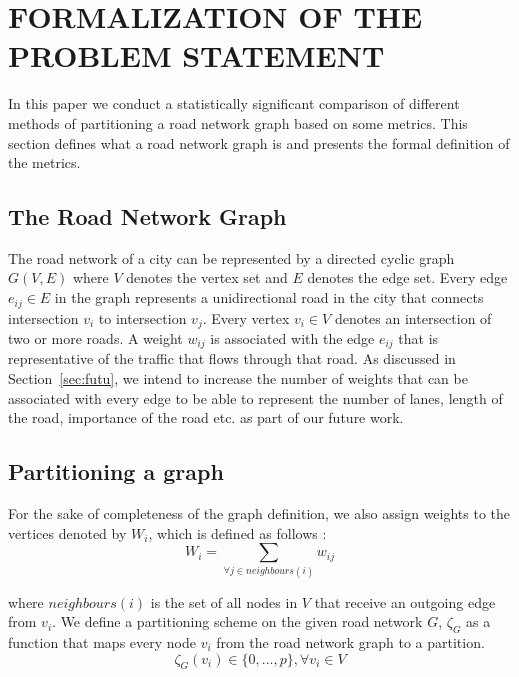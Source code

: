 \section{FORMALIZATION OF THE PROBLEM STATEMENT}
\label{sec:form}

In this paper we conduct a statistically significant comparison of different methods of partitioning a road network graph based on some metrics. This section defines what a road network graph is and presents the formal definition of the metrics.

\subsection{The Road Network Graph}
\label{sec:form-road-netw-grap}
The road network of a city can be represented by a directed cyclic graph~\cite{holden1995mathematical} $G(V, E)$ where $V$ denotes the vertex set and $E$ denotes the edge set. Every edge $e_{ij} \in E$ in the graph represents a unidirectional road in the city that connects intersection $v_i$ to intersection $v_j$. Every vertex $v_i \in V$ denotes an intersection of two or more roads. A weight $w_{ij}$ is associated with the edge $e_{ij}$ that is representative of the traffic that flows through that road. As discussed in Section~\ref{sec:futu}, we intend to increase the number of weights that can be associated with every edge to be able to represent the number of lanes, length of the road, importance of the road etc. as part of our future work.

\subsection{Partitioning a graph}
\label{sec:form-part}
For the sake of completeness of the graph definition, we also assign weights to the vertices denoted by $W_i$, which is defined as follows :
\begin{equation}
\label{eq:vertex-weight}
W_i = \sum\limits_{\forall j \in neighbours(i)} w_{ij}
\end{equation}

\noindent where $neighbours(i)$ is the set of all nodes in $V$ that receive an outgoing edge from $v_i$. We define a partitioning scheme on the given road network $G$, $\zeta_G$ as a function that maps every node $v_i$ from the road network graph to a partition.
\begin{equation}
\label{eq:part-sche}
\zeta_G(v_i) \in \{0,\dots,p\}, \forall v_i \in V
\end{equation}

